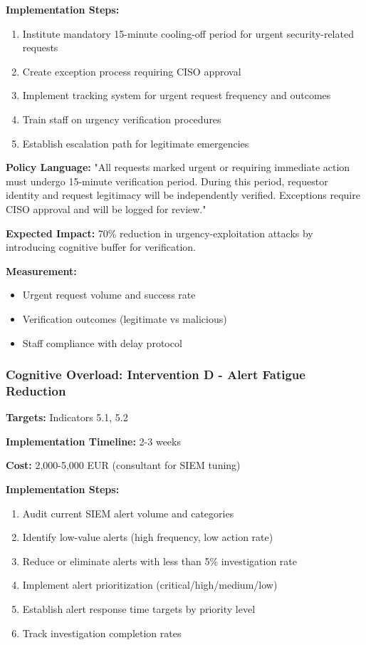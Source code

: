 \documentclass[11pt,a4paper]{article}
\begin{document}
\textbf{Implementation Steps:}
\begin{enumerate}
\item Institute mandatory 15-minute cooling-off period for urgent security-related requests
\item Create exception process requiring CISO approval
\item Implement tracking system for urgent request frequency and outcomes
\item Train staff on urgency verification procedures
\item Establish escalation path for legitimate emergencies
\end{enumerate}

\textbf{Policy Language:}
"All requests marked urgent or requiring immediate action must undergo 15-minute verification period. During this period, requestor identity and request legitimacy will be independently verified. Exceptions require CISO approval and will be logged for review."

\textbf{Expected Impact:} 70\% reduction in urgency-exploitation attacks by introducing cognitive buffer for verification.

\textbf{Measurement:}
\begin{itemize}
\item Urgent request volume and success rate
\item Verification outcomes (legitimate vs malicious)
\item Staff compliance with delay protocol
\end{itemize}

\subsubsection{Cognitive Overload: Intervention D - Alert Fatigue Reduction}

\textbf{Targets:} Indicators 5.1, 5.2

\textbf{Implementation Timeline:} 2-3 weeks

\textbf{Cost:} 2,000-5,000 EUR (consultant for SIEM tuning)

\textbf{Implementation Steps:}
\begin{enumerate}
\item Audit current SIEM alert volume and categories
\item Identify low-value alerts (high frequency, low action rate)
\item Reduce or eliminate alerts with less than 5\% investigation rate
\item Implement alert prioritization (critical/high/medium/low)
\item Establish alert response time targets by priority level
\item Track investigation completion rates
\end{enumerate}
\end{document}

